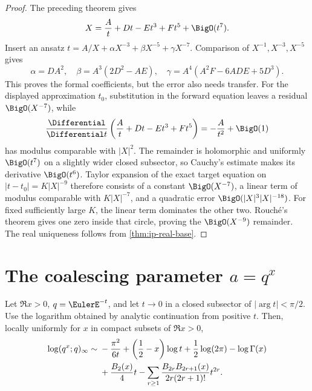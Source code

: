 \begin{proof}
The preceding theorem gives
\[
 X=\frac At+Dt-Et^3+Ft^5+\BigO(t^7).
\]
Insert an ansatz \(t=A/X+\alpha X^{-3}+\beta X^{-5}+\gamma X^{-7}\).
Comparison of \(X^{-1},X^{-3},X^{-5}\) gives
\[
 \alpha=DA^2,\quad
 \beta=A^3(2D^2-AE),\quad
 \gamma=A^4(A^2F-6ADE+5D^3).
\]
This proves the formal coefficients, but the error also needs transfer.
For the displayed approximation \(t_0\), substitution in the forward
equation leaves a residual \(\BigO(X^{-7})\), while
\[
 \frac{\Differential}{\Differential t}\left(\frac At+Dt-Et^3+Ft^5\right)
 =-\frac A{t^2}+\BigO(1)
\]
has modulus comparable with \(|X|^2\).  The remainder is holomorphic and
uniformly \(\BigO(t^7)\) on a slightly wider closed subsector, so Cauchy's
estimate makes its derivative \(\BigO(t^6)\).  Taylor expansion of the exact
target equation on
\(|t-t_0|=K|X|^{-9}\) therefore consists of a constant
\(\BigO(X^{-7})\), a linear term of modulus comparable with
\(K|X|^{-7}\), and a quadratic error
\(\BigO(|X|^3|X|^{-18})\).  For fixed sufficiently large \(K\), the linear
term dominates the other two.  Rouché's theorem gives one zero inside that
circle, proving the \(\BigO(X^{-9})\) remainder.  The real uniqueness follows
from \cref{thm:ip-real-base}.
\end{proof}

\section{The coalescing parameter \(a=q^x\)}
\label{sec:ip-qx}

\begin{theorem}
\label{thm:ip-qx-expansion}
Let \(\Re x>0\), \(q=\EulerE^{-t}\), and let \(t\to0\) in a closed subsector of
\(|\arg t|<\pi/2\).  Use the logarithm obtained by analytic continuation from
positive \(t\).  Then, locally uniformly for \(x\) in compact subsets of
\(\Re x>0\),
\begin{align}
 \log(q^x;q)_\infty
 \sim{}&-\frac{\pi^2}{6t}
 +\left(\frac12-x\right)\log t
 +\frac12\log(2\pi)-\log\Gamma(x) \notag\\
 &+\frac{B_2(x)}4t
 -\sum_{r\geq1}
 \frac{B_{2r}B_{2r+1}(x)}{2r(2r+1)!}t^{2r}.
 \label{eq:ip-qx-expansion}
\end{align}
\end{theorem}

